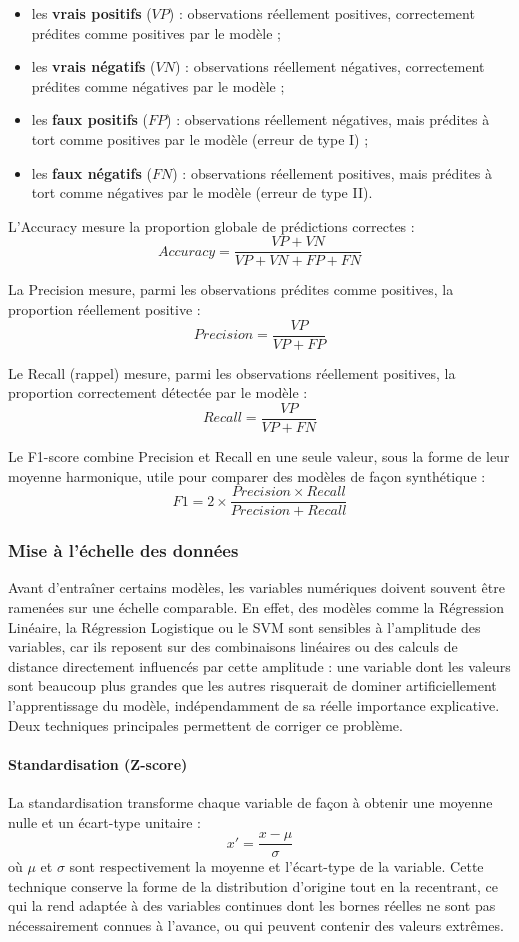 \documentclass[a4paper,12pt, oneside]{article}
\begin{document}
\begin{itemize}
\item les \textbf{vrais positifs} ($VP$) : observations réellement positives, correctement prédites comme positives par le modèle ;
\item les \textbf{vrais négatifs} ($VN$) : observations réellement négatives, correctement prédites comme négatives par le modèle ;
\item les \textbf{faux positifs} ($FP$) : observations réellement négatives, mais prédites à tort comme positives par le modèle (erreur de type I) ;
\item les \textbf{faux négatifs} ($FN$) : observations réellement positives, mais prédites à tort comme négatives par le modèle (erreur de type II).
\end{itemize}

L'Accuracy mesure la proportion globale de prédictions correctes :
\[
Accuracy = \frac{VP + VN}{VP + VN + FP + FN}
\]

La Precision mesure, parmi les observations prédites comme positives, la proportion réellement positive :
\[
Precision = \frac{VP}{VP + FP}
\]

Le Recall (rappel) mesure, parmi les observations réellement positives, la proportion correctement détectée par le modèle :
\[
Recall = \frac{VP}{VP + FN}
\]

Le F1-score combine Precision et Recall en une seule valeur, sous la forme de leur moyenne harmonique, utile pour comparer des modèles de façon synthétique :
\[
F1 = 2 \times \frac{Precision \times Recall}{Precision + Recall}
\]


\subsubsection{Mise à l'échelle des données}

Avant d'entraîner certains modèles, les variables numériques doivent souvent être ramenées sur une échelle comparable. En effet, des modèles comme la Régression Linéaire, la Régression Logistique ou le SVM sont sensibles à l'amplitude des variables, car ils reposent sur des combinaisons linéaires ou des calculs de distance directement influencés par cette amplitude : une variable dont les valeurs sont beaucoup plus grandes que les autres risquerait de dominer artificiellement l'apprentissage du modèle, indépendamment de sa réelle importance explicative. Deux techniques principales permettent de corriger ce problème.

\paragraph{Standardisation (Z-score)\\}
La standardisation transforme chaque variable de façon à obtenir une moyenne nulle et un écart-type unitaire :
\[
x' = \frac{x - \mu}{\sigma}
\]
où $\mu$ et $\sigma$ sont respectivement la moyenne et l'écart-type de la variable. Cette technique conserve la forme de la distribution d'origine tout en la recentrant, ce qui la rend adaptée à des variables continues dont les bornes réelles ne sont pas nécessairement connues à l'avance, ou qui peuvent contenir des valeurs extrêmes.
\end{document}
